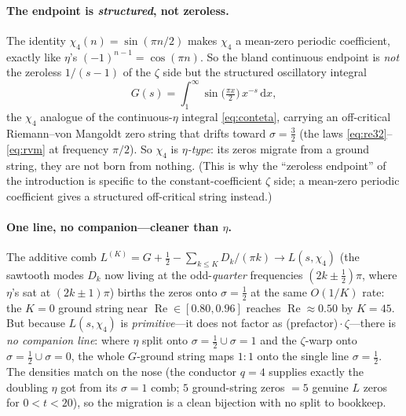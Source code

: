 \documentclass[11pt]{article}
\theoremstyle{definition}
\renewcommand{\Re}{\operatorname{Re}}
\newcommand{\dd}{\mathrm{d}}
\begin{document}
\paragraph{The endpoint is \emph{structured}, not zeroless.}
The identity $\chi_4(n)=\sin(\pi n/2)$ makes $\chi_4$ a mean-zero periodic
coefficient, exactly like $\eta$'s $(-1)^{n-1}=\cos(\pi n)$. So the bland continuous
endpoint is \emph{not} the zeroless $1/(s-1)$ of the $\zeta$ side but the structured
oscillatory integral
\begin{equation}\label{eq:Gchi4}
  G(s)=\int_1^\infty \sin\!\bigl(\tfrac{\pi x}{2}\bigr)\,x^{-s}\,\dd x,
\end{equation}
the $\chi_4$ analogue of the continuous-$\eta$ integral \eqref{eq:conteta}, carrying
an off-critical Riemann--von Mangoldt zero string that drifts toward $\sigma=\tfrac32$
(the laws \eqref{eq:re32}--\eqref{eq:rvm} at frequency $\pi/2$). So $\chi_4$ is
\emph{$\eta$-type}: its zeros migrate from a ground string, they are not born from
nothing. (This is why the ``zeroless endpoint'' of the introduction is specific to
the constant-coefficient $\zeta$ side; a mean-zero periodic coefficient gives a
structured off-critical string instead.)

\paragraph{One line, no companion---cleaner than $\eta$.}
The additive comb $L^{(K)}=G+\tfrac12-\sum_{k\le K}D_k/(\pi k)\to L(s,\chi_4)$ (the
sawtooth modes $D_k$ now living at the odd-\emph{quarter} frequencies
$(2k\pm\tfrac12)\pi$, where $\eta$'s sat at $(2k\pm1)\pi$) births the zeros onto
$\sigma=\tfrac12$ at the same $O(1/K)$ rate: the $K=0$ ground string near
$\Re\in[0.80,0.96]$ reaches $\Re\approx0.50$ by $K=45$. But because $L(s,\chi_4)$ is
\emph{primitive}---it does not factor as (prefactor)\,$\cdot\,\zeta$---there is
\emph{no companion line}: where $\eta$ split onto $\sigma=\tfrac12\cup\sigma=1$ and
the $\zeta$-warp onto $\sigma=\tfrac12\cup\sigma=0$, the whole $G$-ground string maps
$1{:}1$ onto the single line $\sigma=\tfrac12$. The densities match on the nose (the
conductor $q=4$ supplies exactly the doubling $\eta$ got from its $\sigma=1$ comb; $5$
ground-string zeros $=5$ genuine $L$ zeros for $0<t<20$), so the migration is a clean
bijection with no split to bookkeep.
\end{document}
